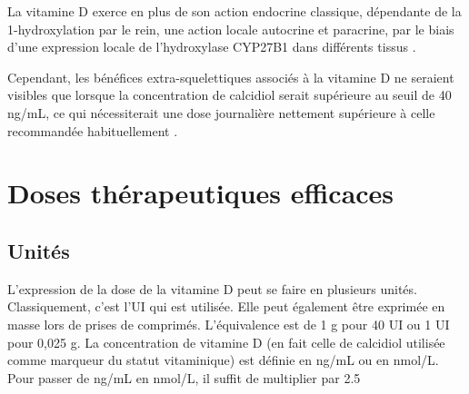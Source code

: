 \documentclass[
  a4paper,
  DIV=11,
  numbers=noendperiod,
  listof=totoc]{scrreprt}
\begin{document}
La vitamine D exerce en plus de son action endocrine classique,
dépendante de la 1-hydroxylation par le rein, une action locale
autocrine et paracrine, par le biais d'une expression locale de
l'hydroxylase \ac{CYP27B1} dans différents tissus
\autocite{Carmeliet.2015,Cannell.2008}.

Cependant, les bénéfices extra-squelettiques associés à la vitamine D ne
seraient visibles que lorsque la concentration de calcidiol serait
supérieure au seuil de 40 ng/mL, ce qui nécessiterait une dose
journalière nettement supérieure à celle recommandée habituellement
\autocite{Caprio.2017}.

\hypertarget{doses-thuxe9rapeutiques-efficaces}{%
\section{Doses thérapeutiques
efficaces}\label{doses-thuxe9rapeutiques-efficaces}}

\hypertarget{unituxe9s}{%
\subsection{Unités}\label{unituxe9s}}

L'expression de la dose de la vitamine D peut se faire en plusieurs
unités. Classiquement, c'est l'\ac{UI} qui est utilisée. Elle peut
également être exprimée en masse lors de prises de comprimés.
L'équivalence est de 1 g pour 40 \ac{UI} ou 1 \ac{UI} pour 0,025 g. La
concentration de vitamine D (en fait celle de calcidiol utilisée comme
marqueur du statut vitaminique) est définie en ng/mL ou en nmol/L. Pour
passer de ng/mL en nmol/L, il suffit de multiplier par 2.5
\autocite{Pramyothin.2012}
\end{document}
